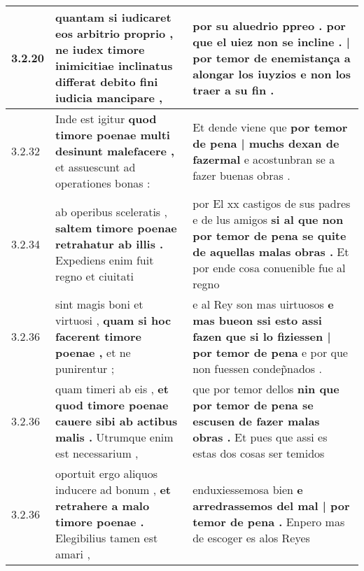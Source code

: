 \begin{tabular}{|p{1cm}|p{6.5cm}|p{6.5cm}|}
3.2.20 & quantam si iudicaret eos arbitrio proprio , \textbf{ ne iudex timore inimicitiae inclinatus differat } debito fini iudicia mancipare , & por su aluedrio ppreo . \textbf{ por que el uiez non se incline . | por temor de enemistança a alongar los iuyzios } e non los traer a su fin . \\\hline
3.2.32 & Inde est igitur \textbf{ quod timore poenae multi desinunt malefacere , } et assuescunt ad operationes bonas : & Et dende viene que \textbf{ por temor de pena | muchs dexan de fazermal } e acostunbran se a fazer buenas obras . \\\hline
3.2.34 & ab operibus sceleratis , \textbf{ saltem timore poenae retrahatur ab illis . } Expediens enim fuit regno et ciuitati & por El xx castigos de sus padres e de lus amigos \textbf{ si al que non por temor de pena se quite de aquellas malas obras . } Et por ende cosa conuenible fue al regno \\\hline
3.2.36 & sint magis boni et virtuosi , \textbf{ quam si hoc facerent timore poenae , } et ne punirentur ; & e al Rey son mas uirtuosos \textbf{ e mas bueon ssi esto assi fazen que si lo fiziessen | por temor de pena } e por que non fuessen condep̃nados . \\\hline
3.2.36 & quam timeri ab eis , \textbf{ et quod timore poenae cauere sibi ab actibus malis . } Utrumque enim est necessarium , & que por temor dellos \textbf{ nin que por temor de pena se escusen de fazer malas obras . } Et pues que assi es estas dos cosas ser temidos \\\hline
3.2.36 & oportuit ergo aliquos inducere ad bonum , \textbf{ et retrahere a malo timore poenae . } Elegibilius tamen est amari , & enduxiessemosa bien \textbf{ e arredrassemos del mal | por temor de pena . } Enpero mas de escoger es alos Reyes \\\hline

\end{tabular}

